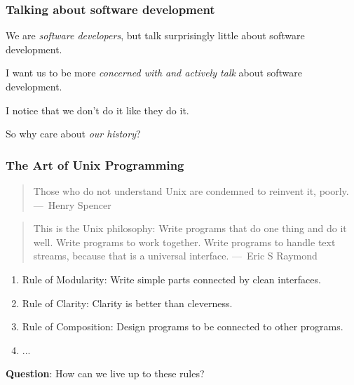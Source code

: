 \documentclass{beamer}
\newcommand{\megaskip}{\bigskip\bigskip\bigskip\bigskip}
\newcommand{\bigpause}{\bigskip\pause}
\begin{document}
\begin{frame}
  \frametitle{Talking about software development}

  We are \emph{software developers}, but talk surprisingly little about software
  development.

  \bigskip

  I want us to be more \emph{concerned with and actively talk} about software
  development.

  \megaskip\pause

  I notice that we don't do it like they do it.

  \bigskip

  So why care about \emph{our history}?
\end{frame}

\begin{frame}
  \frametitle{The Art of Unix Programming}

  \begin{quote}
    Those who do not understand Unix are condemned to reinvent it, poorly.
    ---~Henry Spencer
  \end{quote}

  \bigpause

  \begin{quote}
    This is the Unix philosophy: Write programs that do one thing and do it
    well.  Write programs to work together.  Write programs to handle text
    streams, because that is a universal interface. ---~Eric S Raymond
  \end{quote}

  \bigpause

  \begin{enumerate}
  \item Rule of Modularity: Write simple parts connected by clean interfaces.
  \item Rule of Clarity: Clarity is better than cleverness.
  \item Rule of Composition: Design programs to be connected to other programs.
  \item ...
  \end{enumerate}

  \textbf{Question}: How can we live up to these rules?

\end{frame}
\end{document}
